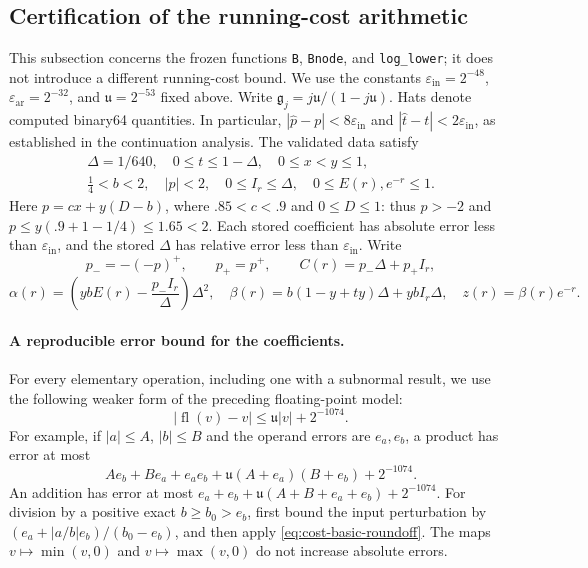 \subsection{Certification of the running-cost arithmetic}
\label{sec:cost-roundoff}

This subsection concerns the frozen functions \texttt{B}, \texttt{Bnode}, and
\texttt{log\_lower}; it does not introduce a different running-cost bound.
We use the constants $\varepsilon_{\mathrm{in}}=2^{-48}$,
$\varepsilon_{\mathrm{ar}}=2^{-32}$, and $\mathfrak u=2^{-53}$ fixed above.
Write $\mathfrak g_j=j\mathfrak u/(1-j\mathfrak u)$.
Hats denote computed binary64 quantities.  In particular,
$|\widehat p-p|<8\varepsilon_{\mathrm{in}}$ and
$|\widehat t-t|<2\varepsilon_{\mathrm{in}}$, as established in the
continuation analysis.  The validated data satisfy
\[
 \begin{gathered}
 \Delta=1/640,\quad 0\le t\le1-\Delta,\quad 0\le x<y\le1,\\
 \tfrac14<b<2,\quad |p|<2,\quad 0\le I_r\le\Delta,\quad 0\le E(r),e^{-r}\le1.
 \end{gathered}
\]
Here $p=cx+y(D-b)$, where $.85<c<.9$ and $0\le D\le1$: thus
$p>-2$ and $p\le y(.9+1-1/4)\le1.65<2$.
Each stored coefficient has absolute error less than
$\varepsilon_{\mathrm{in}}$, and the stored $\Delta$ has relative error
less than $\varepsilon_{\mathrm{in}}$.  Write
\[
 p_-=-(-p)^+,\qquad p_+=p^+,\qquad
 C(r)=p_-\Delta+p_+I_r,
\]
\[
 \alpha(r)=\left(ybE(r)-\frac{p_-I_r}\Delta\right)\Delta^2,
 \quad \beta(r)=b(1-y+ty)\Delta+ybI_r\Delta,
 \quad z(r)=\beta(r)e^{-r}.
\]

\paragraph{A reproducible error bound for the coefficients.}
For every elementary operation, including one with a subnormal result, we
use the following weaker form of the preceding floating-point model:
\begin{equation}
 |\operatorname{fl}(v)-v|\le\mathfrak u|v|+2^{-1074}.
 \label{eq:cost-basic-roundoff}
\end{equation}
For example, if $|a|\le A$, $|b|\le B$ and the operand errors are
$e_a,e_b$, a product has error at most
\[
 Ae_b+Be_a+e_ae_b+
 \mathfrak u(A+e_a)(B+e_b)+2^{-1074}.
\]
An addition has error at most
$e_a+e_b+\mathfrak u(A+B+e_a+e_b)+2^{-1074}$.
For division by a positive exact $b\ge b_0>e_b$, first bound the input
perturbation by $(e_a+|a/b|e_b)/(b_0-e_b)$, and then apply
\eqref{eq:cost-basic-roundoff}.  The maps $v\mapsto\min(v,0)$ and
$v\mapsto\max(v,0)$ do not increase absolute errors.

